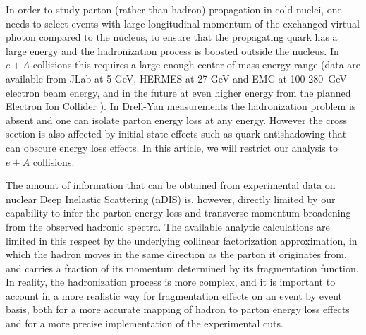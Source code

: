 In order to study parton (rather than hadron) propagation in cold nuclei, one 
needs to select events with large longitudinal momentum of the exchanged 
virtual photon compared to the nucleus, to ensure that the propagating quark 
has a large energy and the hadronization process is boosted outside the 
nucleus. In $e+A$ collisions this requires a large enough center of mass energy 
range (data are available from JLab at 5 GeV, HERMES at 27 GeV and EMC at 
100-280~GeV electron beam energy, and in the future at even higher energy from 
the planned Electron Ion Collider \cite{Accardi:2009qv}). In Drell-Yan 
measurements the hadronization problem is absent and one can isolate parton 
energy loss at any energy. However the cross section is also affected by 
initial state effects such as quark antishadowing that can obscure energy loss 
effects. In this article, we will restrict our analysis to $e+A$ collisions.

The amount of information that can be obtained from experimental data on 
nuclear Deep Inelastic Scattering (nDIS) is, however, directly limited by our 
capability to infer the parton energy loss and transverse momentum broadening 
from the observed hadronic spectra. The available analytic calculations 
\cite{Accardi:2009qv} are limited in this respect by the underlying collinear 
factorization approximation, in which the hadron moves in the same direction 
as the parton it originates from, and carries a fraction of its momentum 
determined by its fragmentation function. In reality, the hadronization process 
is more complex, and it is important to account in a more realistic way for 
fragmentation effects on an event by event basis, both for a more accurate 
mapping of hadron to parton energy loss effects and for a more precise 
implementation of the experimental cuts.

